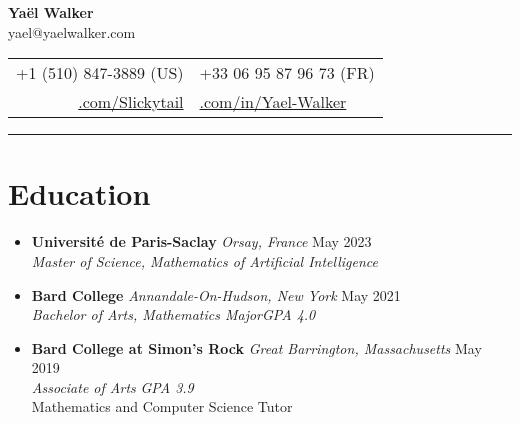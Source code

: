 \documentclass[12pt,letterpaper]{article}
\begin{document}
\begin{center}
	{\LARGE{\textbf{Yaël Walker}}}\\[0.05in]
        yael@yaelwalker.com\\[0.04in]
	\begin{tabular}{r @{\hskip 0.1in}|@{\hskip 0.1in} l}
        +1 (510) 847-3889 (US) & +33 06 95 87 96 73 (FR)\\
		\href{https://github.com/Slickytail}{\faGithub.com/Slickytail} &
		\href{https://linkedin.com/in/yael-walker}{\faLinkedinSquare.com/in/Yael-Walker}
	\end{tabular}
\end{center}
\hrule \vspace{-0.5em}

\section*{Education} \vspace{-0.5em}
\begin{itemize}[label=,itemsep=0pt]
    \item
    \textbf{Université de Paris-Saclay} \textit{Orsay, France} \hfill May 2023\\
    \textit{Master of Science, Mathematics of Artificial Intelligence}
	\item
	\textbf{Bard College} \textit{Annandale-On-Hudson, New York} \hfill May 2021\\
    \textit{Bachelor of Arts, Mathematics Major}\hfill \textit{GPA 4.0}
	\item
	\textbf{Bard College at Simon's Rock} \textit{Great Barrington, Massachusetts} \hfill May 2019\\
	\textit{Associate of Arts} \hfill \textit{GPA 3.9}\\
	Mathematics and Computer Science Tutor
\end{itemize}
\vspace{-2em}
\end{document}
